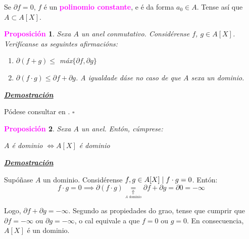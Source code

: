 \documentclass[twoside]{report}
\newcommand{\magbf}[1]{\textcolor{magenta}{\textbf{#1}}} %
\theoremstyle{mystyle}
\newtheorem{prop}{\magbf{Proposición}}[chapter]
\newenvironment{proposition}
{\begin{mdframed}[linecolor = magenta,backgroundcolor = classicrose, linewidth = 2mm]\begin{prop}}
{\end{prop}\end{mdframed}}
\begin{document}
\noindent Se $\partial f = 0$, $f$ é un \magbf{polinomio constante}, e é da forma $a_{0} \in A$. Tense así que $A \subset A[X]$.\\

\begin{proposition} \label{prop2.17}
Sexa $A$ un anel conmutativo. Considérense $f$, $g \in A[X]$. Verifícanse as seguintes afirmacións:
\begin{enumerate}
    \item $\partial (f+g) \leq$ máx$\{\partial f, \partial g\}$ 
    \item $\partial (f \cdot g) \leq \partial f + \partial g$. A igualdade dáse no caso de que $A$ sexa un dominio.
\end{enumerate}
\end{proposition}

\vspace{2mm}

\noindent \textbf{\textit{\underline{Demostración}}}

\vspace{2mm}

\noindent Pódese consultar en \cite{hartley}. $\square$\\ 

\begin{proposition} \label{prop2.18}
Sexa $A$ un anel. Entón, cúmprese:
\begin{center}
    $A$ é dominio $ \Longleftrightarrow A[X]$ é dominio  
\end{center}
\end{proposition}

\vspace{2mm}

\noindent \textbf{\textit{\underline{Demostración}}}

\vspace{2mm}

\noindent {} Supóñase $A$ un dominio. Considérense $f,g \in A[X] \hspace{1mm} | \hspace{1mm} f \cdot g = 0$. Entón:
$$f \cdot g = 0 \implies \partial (f \cdot g) \underset{\underset{A \text{ dominio}}{\Uparrow}}{=} \partial f + \partial g = \partial 0 = -\infty$$

\noindent Logo, $\partial f + \partial g = -\infty$. Segundo as propiedades do grao, tense que cumprir que $\partial f = -\infty$ ou $\partial g = -\infty$, o cal equivale a que $f = 0$ ou $g = 0$. En consecuencia, $A[X]$ é un dominio.\\
\end{document}
